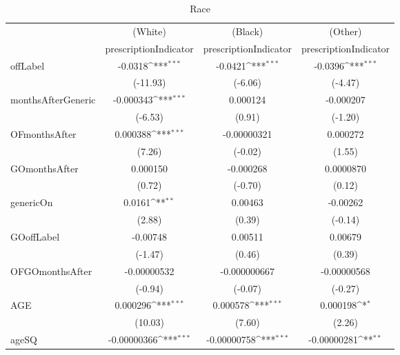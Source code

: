 \begin{table}[htbp]\centering
\def\sym#1{\ifmmode^{#1}\else\(^{#1}\)\fi}
\caption{Race\label{tab1}}
\begin{tabular}{l*{3}{c}}
\hline\hline
            &\multicolumn{1}{c}{(White)}&\multicolumn{1}{c}{(Black)}&\multicolumn{1}{c}{(Other)}\\
            &\multicolumn{1}{c}{prescriptionIndicator}&\multicolumn{1}{c}{prescriptionIndicator}&\multicolumn{1}{c}{prescriptionIndicator}\\
\hline
offLabel    &     -0.0318\sym{***}&     -0.0421\sym{***}&     -0.0396\sym{***}\\
            &    (-11.93)         &     (-6.06)         &     (-4.47)         \\
[1em]
monthsAfterGeneric&   -0.000343\sym{***}&    0.000124         &   -0.000207         \\
            &     (-6.53)         &      (0.91)         &     (-1.20)         \\
[1em]
OFmonthsAfter&    0.000388\sym{***}& -0.00000321         &    0.000272         \\
            &      (7.26)         &     (-0.02)         &      (1.55)         \\
[1em]
GOmonthsAfter&    0.000150         &   -0.000268         &   0.0000870         \\
            &      (0.72)         &     (-0.70)         &      (0.12)         \\
[1em]
genericOn   &      0.0161\sym{**} &     0.00463         &    -0.00262         \\
            &      (2.88)         &      (0.39)         &     (-0.14)         \\
[1em]
GOoffLabel  &    -0.00748         &     0.00511         &     0.00679         \\
            &     (-1.47)         &      (0.46)         &      (0.39)         \\
[1em]
OFGOmonthsAfter& -0.00000532         &-0.000000667         & -0.00000568         \\
            &     (-0.94)         &     (-0.07)         &     (-0.27)         \\
[1em]
AGE         &    0.000296\sym{***}&    0.000578\sym{***}&    0.000198\sym{*}  \\
            &     (10.03)         &      (7.60)         &      (2.26)         \\
[1em]
ageSQ       & -0.00000366\sym{***}& -0.00000758\sym{***}& -0.00000281\sym{**} \\

\end{tabular}
\end{table}
